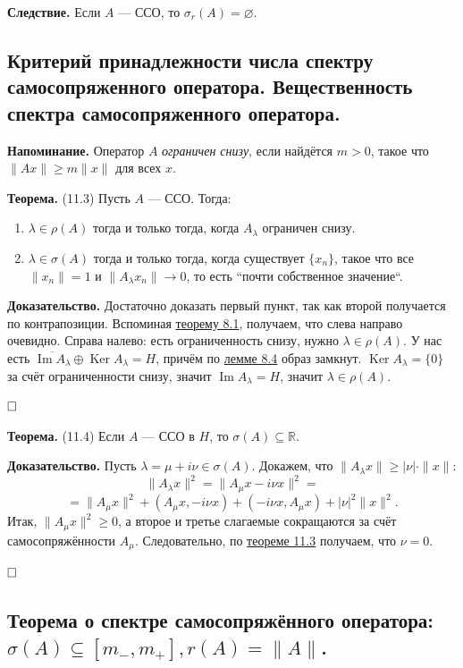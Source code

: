 \documentclass[12pt, a4paper]{article}
\DeclareMathOperator{\im}{Im}
\DeclareMathOperator{\Ker}{Ker}
\newcommand{\QED}{$\hfill\square$}
\renewcommand{\ge}{\geqslant}  %
\renewcommand{\subset}{\subseteq}   %
\begin{document}
\textbf{Следствие.} Если $A$ --- ССО, то $\sigma_r(A) = \varnothing$.



\subsection{Критерий принадлежности числа спектру самосопряженного оператора. Вещественность спектра самосопряженного оператора.}

\textbf{Напоминание.} Оператор $A$ \textit{ограничен снизу}, если найдётся $m > 0$, такое что $\|A x\| \ge m \|x\|$ для всех $x$.

 \label{th:11-3} \textbf{Теорема.} (11.3) Пусть $A$ --- ССО.
Тогда:
\begin{enumerate}
    \item $\lambda \in \rho(A)$ тогда и только тогда, когда $A_\lambda$ ограничен снизу.
    \item $\lambda \in \sigma(A)$ тогда и только тогда, когда существует $\{x_n\}$, такое что все $\|x_n\| = 1$ и $\|A_\lambda x_n\| \to 0$, то есть ``почти собственное значение``.
\end{enumerate}

\textbf{Доказательство.} Достаточно доказать первый пункт, так как второй получается по контрапозиции. Вспоминая \hyperref[th:8-1]{теорему 8.1}, получаем, что слева направо очевидно.
Справа налево: есть ограниченность снизу, нужно $\lambda \in \rho(A)$.
У нас есть $\overline{\im A_\lambda} \oplus \Ker A_\lambda = H$, причём по \hyperref[8.4_lemma]{лемме 8.4} образ замкнут. $\Ker A_\lambda = \{0\}$ за счёт ограниченности снизу, значит $\im A_\lambda = H$, значит $\lambda \in \rho(A)$.

\QED

 \label{th:11-4} \textbf{Теорема.} (11.4) Если $A$ --- ССО в $H$, то $\sigma(A) \subset \mathbb R$.

\textbf{Доказательство.} Пусть $\lambda = \mu + i \nu \in \sigma(A)$.
Докажем, что $\|A_\lambda x\| \ge |\nu| \cdot \|x\|$:
\[
    \|A_\lambda x\|^2 = \|A_\mu x - i \nu x\|^2 = 
\]
\[
    = \|A_\mu x\|^2 + (A_\mu x, - i\nu x) + (-i \nu x, A_\mu x) + |\nu|^2 \|x\|^2.
\]
Итак, $\|A_\mu x\|^2 \ge 0$, а второе и третье слагаемые сокращаются за счёт самосопряжённости $A_\mu$.
Следовательно, по \hyperref[th:11-3]{теореме 11.3} получаем, что $\nu = 0$.

\QED



\subsection{Теорема о спектре самосопряжённого оператора: \texorpdfstring{$\sigma(A) \subseteq [m_-, m_+], r(A) = \|A\|$}{sigma(A) <= [m-, m+], r(A) = ||A||}.}
\end{document}
